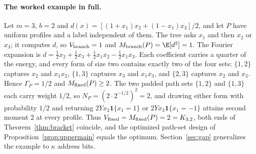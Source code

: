 \paragraph{The worked example in full.}
Let $m=3$, $b=2$ and $d(x)=[(1+x_1)x_2+(1-x_1)x_3]/2$, and let $P$ have uniform profiles and a label independent of them. The tree asks $x_1$ and then $x_2$ or $x_3$; it computes $d$, so $V_{\rm branch}=1$ and $M_{\rm branch}(P)=\E[d^2]=1$. The Fourier expansion is $d=\tfrac12x_2+\tfrac12x_3+\tfrac12x_1x_2-\tfrac12x_1x_3$. Each coefficient carries a quarter of the energy, and every form of size two contains exactly two of the four sets: $\{1,2\}$ captures $x_2$ and $x_1x_2$, $\{1,3\}$ captures $x_3$ and $x_1x_3$, and $\{2,3\}$ captures $x_2$ and $x_3$. Hence $\Gamma_P=1/2$ and $M_{\rm fixed}(P)\ge2$. The two padded path sets $\{1,2\}$ and $\{1,3\}$ each carry weight $1/2$, so $N_P=(2\cdot2^{-1/2})^2=2$, and drawing either form with probability $1/2$ and returning $2Yx_2\mathbf1\{x_1=1\}$ or $2Yx_3\mathbf1\{x_1=-1\}$ attains second moment $2$ at every profile. Thus $V_{\rm fixed}=M_{\rm fixed}(P)=2=K_{3,2}$, both ends of Theorem~\ref{thm:bracket} coincide, and the optimized path-set design of Proposition~\ref{prop:uppermain} equals the optimum. Section~\ref{sec:gap} generalizes the example to $\kappa$ address bits.
